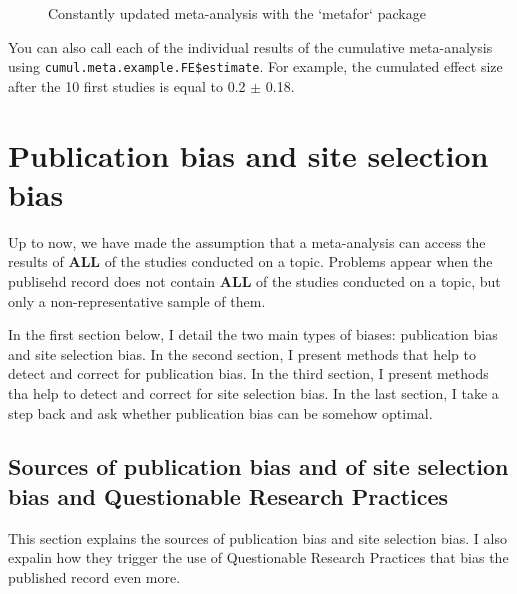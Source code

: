 \documentclass[]{book}
\theoremstyle{definition}
\theoremstyle{definition}
\theoremstyle{definition}
\theoremstyle{remark}
\begin{document}
\begin{figure}[htbp]

{\centering {}

}

\caption{Constantly updated meta-analysis with the `metafor` package}\label{fig:cumWMAEmetafor}
\end{figure}

You can also call each of the individual results of the cumulative meta-analysis using \texttt{cumul.meta.example.FE\$estimate}.
For example, the cumulated effect size after the 10 first studies is equal to 0.2 \(\pm\) 0.18.

\hypertarget{publication-bias-and-site-selection-bias}{%
\section{Publication bias and site selection bias}\label{publication-bias-and-site-selection-bias}}

Up to now, we have made the assumption that a meta-analysis can access the results of \textbf{ALL} of the studies conducted on a topic.
Problems appear when the publisehd record does not contain \textbf{ALL} of the studies conducted on a topic, but only a non-representative sample of them.

In the first section below, I detail the two main types of biases: publication bias and site selection bias.
In the second section, I present methods that help to detect and correct for publication bias.
In the third section, I present methods tha help to detect and correct for site selection bias.
In the last section, I take a step back and ask whether publication bias can be somehow optimal.

\hypertarget{sources-of-publication-bias-and-of-site-selection-bias-and-questionable-research-practices}{%
\subsection{Sources of publication bias and of site selection bias and Questionable Research Practices}\label{sources-of-publication-bias-and-of-site-selection-bias-and-questionable-research-practices}}

This section explains the sources of publication bias and site selection bias.
I also expalin how they trigger the use of Questionable Research Practices that bias the published record even more.
\end{document}
